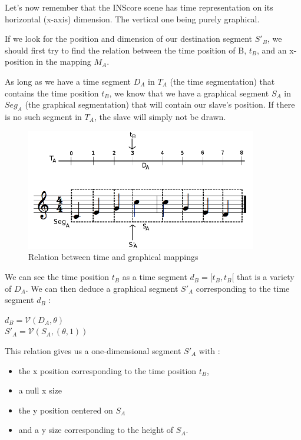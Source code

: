 \documentclass[a4paper]{article}
\newcommand{\variete}			{\ensuremath{\mathcal{V}}}
\begin{document}

Let's now remember that the INScore scene has time representation on its horizontal (x-axis) dimension. The vertical one being purely graphical.

If we look for the position and dimension of our destination segment $S'_B$, we should first try to find the relation between the time position of B, $t_B$, and an x-position in the mapping $M_A$. 

As long as we have a time segment $D_A$ in $T_A$ (the time segmentation) that contains the time position $t_B$, we know that we have a graphical segment $S_A$ in $Seg_A$ (the graphical segmentation) that will contain our slave's position. If there is no such segment in $T_A$, the slave will simply not be drawn.

\begin{figure}[h]
\begin{center}
\includegraphics[height=53mm]{img/segmentations.png}
\caption{Relation between time and graphical mappings}
\label{fig:time2graphic}
\end{center}
\end{figure}

We can see the time position $t_B$ as a time segment $d_B = [t_B, t_B[$ that is a variety of $D_A$. We can then deduce a graphical segment $S'_A$ corresponding to the time segment $d_B$ :

\begin{center}
$d_B = \variete(D_A, \theta)$\\
$S'_A = \variete(S_A, (\theta, 1))$
\end{center}

This relation gives us a one-dimensional segment $S'_A$ with :
\begin{itemize}
  \item the x position corresponding to the time position $t_B$, 
  \item a null x size
  \item the y position centered on $S_A$
  \item and a y size corresponding to the height of $S_A$.
\end{itemize} 
\end{document}
